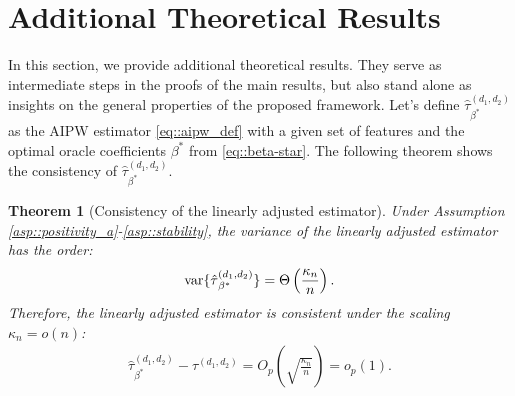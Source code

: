 \documentclass{article}
\theoremstyle{plain}
\newtheorem{theorem}{Theorem}[section]
\theoremstyle{definition}
\theoremstyle{remark}
\newcommand{\var}{\textup{var}}
\begin{document}
\section{Additional Theoretical Results}
In this section, we provide additional theoretical results. They serve as intermediate steps in the proofs of the main results, but also stand alone as insights on the general properties of the proposed framework. Let's define $\hat\tau{}^{(d_1, d_2)}_{\beta^*}$ as the AIPW estimator \eqref{eq::aipw_def} with a given set of features and the optimal oracle coefficients $\beta^*$ from \eqref{eq::beta-star}. The following theorem shows the consistency of $\hat\tau{}^{(d_1, d_2)}_{\beta^*}$.
\begin{theorem}[Consistency of the linearly adjusted estimator]\label{thm:consistency}
    Under Assumption \ref{asp::positivity_a}-\ref{asp::stability}, the variance of the linearly adjusted estimator has the order:
    \begin{eqnarray}\label{eq::variance_rate}
        \var\{\hat\tau{}^{(d_1, d_2)}_{\beta^*}\} = \Theta\left(\frac{\kappa_n}{n}\right).
    \end{eqnarray}
    Therefore, the linearly adjusted estimator is consistent under the scaling $\kappa_n = o(n)$:
    \begin{align*}
        \hat\tau{}^{(d_1, d_2)}_{\beta^*} - \tau^{(d_1, d_2)} = O_{p}\left(\sqrt{\frac{\kappa_n}{n}}\right) = o_p(1). 
    \end{align*}
    
\end{theorem}
\end{document}
